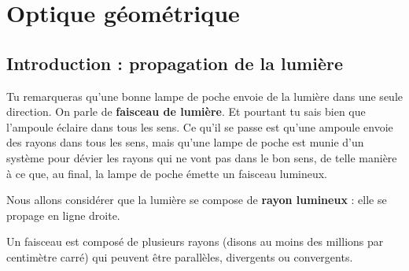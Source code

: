 \documentclass[a4paper,12pt]{book}
\theoremstyle{mes_exemples}	\newtheorem{exemple}[numtho]{Exemple}
\theoremstyle{mes_tho}
\newcommand{\defe}[2]{\textbf{#1}\index{#2}}
\begin{document}
\chapter{Optique géométrique}


\section*{Introduction : propagation de la lumière}

Tu remarqueras qu'une bonne lampe de poche envoie de la lumière dans une seule direction. On parle de \defe{faisceau de lumière}{}. Et pourtant tu sais bien que l'ampoule éclaire dans tous les sens. Ce qu'il se passe est qu'une ampoule envoie des rayons dans tous les sens, mais qu'une lampe de poche est munie d'un système pour dévier les rayons qui ne vont pas dans le bon sens, de telle manière à ce que, au final, la lampe de poche émette un faisceau lumineux.

Nous allons considérer que la lumière se compose de \defe{rayon lumineux}{} : elle se propage en ligne droite. 

Un faisceau est composé de plusieurs rayons (disons au moins des millions par centimètre carré) qui peuvent être parallèles, divergents ou convergents.

\newcommand{\prefigoptfaisc}{%
\pstGeonode(0,-0.3){dA}(3,-0.3){fA}
\pstGeonode(0,0){dB}(3,0){fB}
\pstGeonode(0,0.3){dC}(3,0.3){fC}
}
\end{document}

